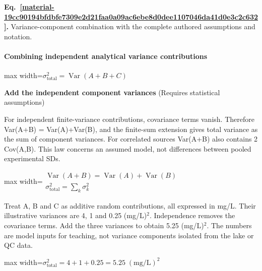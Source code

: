 \documentclass[11pt,a4paper]{article}
\begin{document}
\par\medskip
{}
\label{material-19cc90194bfdbfe7309e2d21faa0a09ac6ebe8d0dee1107046da41d0e3c2c632}
\noindent\textbf{Eq.~\ref*{material-19cc90194bfdbfe7309e2d21faa0a09ac6ebe8d0dee1107046da41d0e3c2c632}.} Variance-component combination with the complete authored assumptions and notation.\par\nopagebreak
\paragraph{Combining independent analytical variance contributions}
\begin{center}\begin{adjustbox}{max width=\linewidth}$\displaystyle \sigma_{\mathrm{total}}^2=\operatorname{Var}(A+B+C)$\end{adjustbox}\end{center}
\noindent\textbf{Add the independent component variances} (Requires statistical assumptions)\par
For independent finite-variance contributions, covariance terms vanish. Therefore Var(A+B) = Var(A)+Var(B), and the finite-sum extension gives total variance as the sum of component variances. For correlated sources Var(A+B) also contains 2 Cov(A,B). This law concerns an assumed model, not differences between pooled experimental SDs.
\begin{center}\begin{adjustbox}{max width=\linewidth}$\displaystyle \begin{gathered}\operatorname{Var}(A+B)=\operatorname{Var}(A)+\operatorname{Var}(B)\\\sigma_{\mathrm{total}}^2=\sum_k\sigma_k^2\end{gathered}$\end{adjustbox}\end{center}

Treat A, B and C as additive random contributions, all expressed in mg/L. Their illustrative variances are 4, 1 and 0.25 (mg/L)\ensuremath{{}^2}.
Independence removes the covariance terms. Add the three variances to obtain 5.25 (mg/L)\ensuremath{{}^2}.
The numbers are model inputs for teaching, not variance components isolated from the lake or QC data.
\begin{center}\begin{adjustbox}{max width=\linewidth}$\displaystyle \sigma_{\mathrm{total}}^2=4+1+0.25=5.25\;(\mathrm{mg/L})^2$\end{adjustbox}\end{center}
\end{document}
